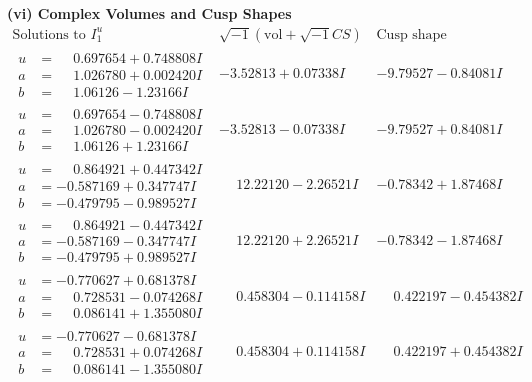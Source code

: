 \documentclass[1p]{elsarticle_modified}
\theoremstyle{definition}
\newcommand{\I}{\sqrt{-1}}
\begin{document}
\newpage\flushleft \textbf{(vi) Complex Volumes and Cusp Shapes}
$$\begin{array}{c|c|c}  
\text{Solutions to }I^u_{1}& \I (\text{vol} + \sqrt{-1}CS) & \text{Cusp shape}\\
 \hline 
\begin{aligned}
u &= \phantom{-}0.697654 + 0.748808 I \\
a &= \phantom{-}1.026780 + 0.002420 I \\
b &= \phantom{-}1.06126 - 1.23166 I\end{aligned}
 & -3.52813 + 0.07338 I & -9.79527 - 0.84081 I \\ \hline\begin{aligned}
u &= \phantom{-}0.697654 - 0.748808 I \\
a &= \phantom{-}1.026780 - 0.002420 I \\
b &= \phantom{-}1.06126 + 1.23166 I\end{aligned}
 & -3.52813 - 0.07338 I & -9.79527 + 0.84081 I \\ \hline\begin{aligned}
u &= \phantom{-}0.864921 + 0.447342 I \\
a &= -0.587169 + 0.347747 I \\
b &= -0.479795 - 0.989527 I\end{aligned}
 & \phantom{-}12.22120 - 2.26521 I & -0.78342 + 1.87468 I \\ \hline\begin{aligned}
u &= \phantom{-}0.864921 - 0.447342 I \\
a &= -0.587169 - 0.347747 I \\
b &= -0.479795 + 0.989527 I\end{aligned}
 & \phantom{-}12.22120 + 2.26521 I & -0.78342 - 1.87468 I \\ \hline\begin{aligned}
u &= -0.770627 + 0.681378 I \\
a &= \phantom{-}0.728531 - 0.074268 I \\
b &= \phantom{-}0.086141 + 1.355080 I\end{aligned}
 & \phantom{-}0.458304 - 0.114158 I & \phantom{-}0.422197 - 0.454382 I \\ \hline\begin{aligned}
u &= -0.770627 - 0.681378 I \\
a &= \phantom{-}0.728531 + 0.074268 I \\
b &= \phantom{-}0.086141 - 1.355080 I\end{aligned}
 & \phantom{-}0.458304 + 0.114158 I & \phantom{-}0.422197 + 0.454382 I \\ \hline\begin{aligned}

\end{aligned}
\end{array}$$
\end{document}
